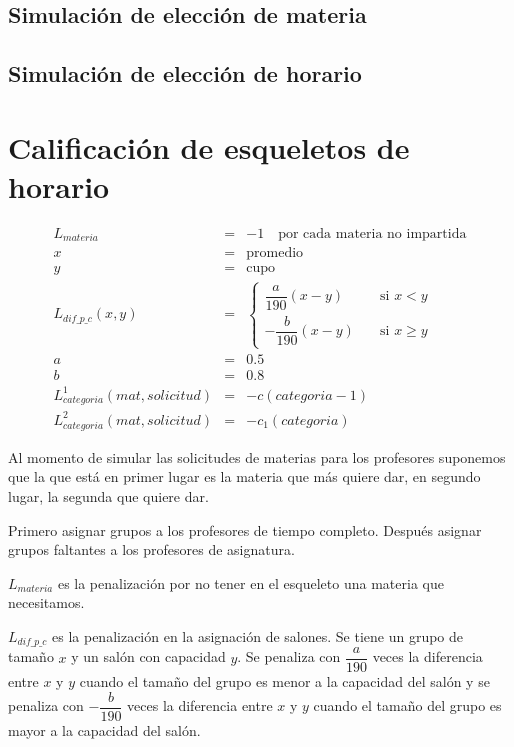 \subsection{Simulación de elección de materia}

\subsection{Simulación de elección de horario}






\section{Calificación de esqueletos de horario}

\begin{eqnarray*}
L_{materia} &=& -1 \,\,\,\,\,\,  \text{por cada materia no impartida}\\
x &=& \text{promedio}\\
y &=& \text{cupo}\\
L_{dif\_p\_c} (x,y) &=& \begin{cases}
    \dfrac{a}{190} (x-y)  & \quad \text{si } x<y\\
    - \dfrac{b}{190} (x-y)  & \quad \text{si } x\geqslant y
  \end{cases}\\
a &=& 0.5\\
b &=& 0.8\\
L_{categoria}^{1} (mat,solicitud) &=& -c(categoria - 1)\\
L_{categoria}^{2} (mat,solicitud) &=& -c_{1}(categoria)
\end{eqnarray*}

Al momento de simular las solicitudes de materias para los profesores suponemos que la que está en primer lugar es la materia que más quiere dar, en segundo lugar, la segunda que quiere dar.

Primero asignar grupos a los profesores de tiempo completo. Después asignar grupos faltantes a los profesores de asignatura.

$L_{materia}$ es la penalización por no tener en el esqueleto una materia que necesitamos.

$L_{dif\_p\_c}$ es la penalización en la asignación de salones. Se tiene un grupo de tamaño $x$ y un salón con capacidad $y$. Se penaliza con $\dfrac{a}{190}$ veces la diferencia entre $x$ y $y$ cuando el tamaño del grupo es menor a la capacidad del salón y se penaliza con $-\dfrac{b}{190}$ veces la diferencia entre $x$ y $y$ cuando el tamaño del grupo es mayor a la capacidad del salón.

